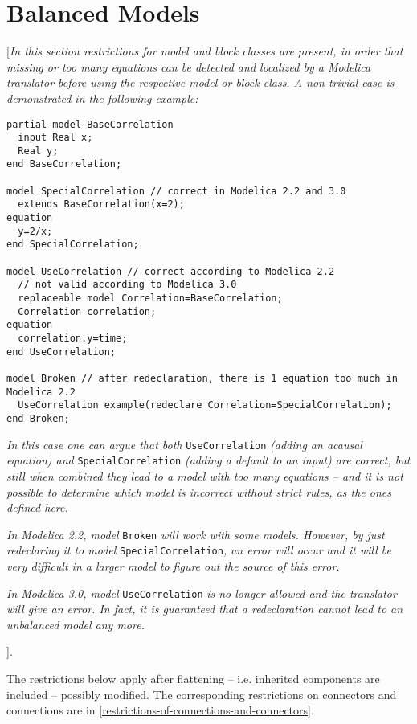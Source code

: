 \section{Balanced Models}

{[}\emph{In this section restrictions for model and block classes are
present, in order that missing or too many equations can be detected and
localized by a Modelica translator before using the respective model or
block class. A non-trivial case is demonstrated in the following
example:}

\begin{lstlisting}[language=modelica]
partial model BaseCorrelation
  input Real x;
  Real y;
end BaseCorrelation;

model SpecialCorrelation // correct in Modelica 2.2 and 3.0
  extends BaseCorrelation(x=2);
equation
  y=2/x;
end SpecialCorrelation;

model UseCorrelation // correct according to Modelica 2.2
  // not valid according to Modelica 3.0
  replaceable model Correlation=BaseCorrelation;
  Correlation correlation;
equation
  correlation.y=time;
end UseCorrelation;

model Broken // after redeclaration, there is 1 equation too much in Modelica 2.2
  UseCorrelation example(redeclare Correlation=SpecialCorrelation);
end Broken;
\end{lstlisting}

\emph{In this case one can argue that both} \lstinline!UseCorrelation! \emph{(adding
an acausal equation) and} \lstinline!SpecialCorrelation! \emph{(adding a default to
an input) are correct, but still when combined they lead to a model with
too many equations -- and it is not possible to determine which model is
incorrect without strict rules, as the ones defined here.}

\emph{In Modelica 2.2, model} \lstinline!Broken! \emph{will work with some models.
However, by just redeclaring it to model} \lstinline!SpecialCorrelation!\emph{, an
error will occur and it will be very difficult in a larger model to
figure out the source of this error. }

\emph{In Modelica 3.0, model} \lstinline!UseCorrelation! \emph{is no longer allowed
and the translator will give an error. In fact, it is guaranteed that a
redeclaration cannot lead to an unbalanced model any more.}

{]}.

The restrictions below apply after flattening -- i.e. inherited
components are included -- possibly modified. The corresponding
restrictions on connectors and connections are in \autoref{restrictions-of-connections-and-connectors}.

